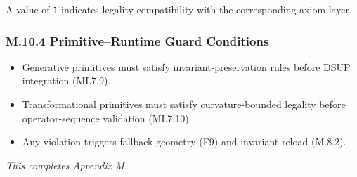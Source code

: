 A value of \texttt{1} indicates legality compatibility with the corresponding
axiom layer.


\subsubsection*{M.10.4 Primitive–Runtime Guard Conditions}

\begin{itemize}
    \item Generative primitives must satisfy invariant-preservation rules before
          DSUP integration (ML7.9).
    \item Transformational primitives must satisfy curvature-bounded legality
          before operator-sequence validation (ML7.10).
    \item Any violation triggers fallback geometry (F9) and invariant reload
          (M.8.2).
\end{itemize}


\medskip
\noindent\textit{This completes Appendix M.}
